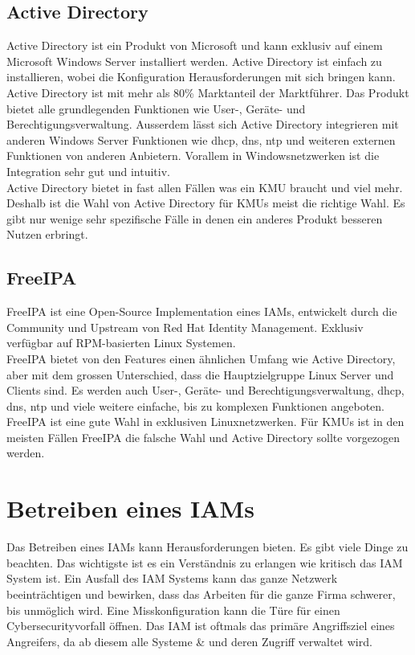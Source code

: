 \subsection{Active Directory}
Active Directory ist ein Produkt von Microsoft und kann exklusiv auf einem Microsoft Windows Server installiert werden. Active Directory ist einfach zu installieren, wobei die Konfiguration Herausforderungen mit sich bringen kann.\\

Active Directory ist mit mehr als 80\% Marktanteil der Marktführer.
Das Produkt bietet alle grundlegenden Funktionen wie User-, Geräte- und Berechtigungsverwaltung.
Ausserdem lässt sich Active Directory integrieren mit anderen Windows Server Funktionen wie \acrshort{dhcp}, \acrshort{dns}, \acrshort{ntp} und weiteren externen Funktionen von anderen Anbietern.
Vorallem in Windowsnetzwerken ist die Integration sehr gut und intuitiv.\\


Active Directory bietet in fast allen Fällen was ein KMU braucht und viel mehr. Deshalb ist die Wahl von Active Directory für KMUs meist die richtige Wahl. Es gibt nur wenige sehr spezifische Fälle in denen ein anderes Produkt besseren Nutzen erbringt.


\subsection{FreeIPA}
FreeIPA ist eine Open-Source Implementation eines IAMs, entwickelt durch die Community und Upstream von Red Hat Identity Management. Exklusiv verfügbar auf RPM-basierten Linux Systemen.\\

FreeIPA bietet von den Features einen ähnlichen Umfang wie Active Directory, aber mit dem grossen Unterschied, dass die Hauptzielgruppe Linux Server und Clients sind. Es werden auch User-, Geräte- und Berechtigungsverwaltung, \acrshort{dhcp}, \acrshort{dns}, \acrshort{ntp} und viele weitere einfache, bis zu komplexen Funktionen angeboten.\\

FreeIPA ist eine gute Wahl in exklusiven Linuxnetzwerken. Für KMUs ist in den meisten Fällen FreeIPA die falsche Wahl und Active Directory sollte vorgezogen werden.


\section{Betreiben eines IAMs}
Das Betreiben eines IAMs kann Herausforderungen bieten.
Es gibt viele Dinge zu beachten.
Das wichtigste ist es ein Verständnis zu erlangen wie kritisch das IAM System ist.
Ein Ausfall des IAM Systems kann das ganze Netzwerk beeinträchtigen und bewirken, dass das Arbeiten für die ganze Firma schwerer, bis unmöglich wird.
Eine Misskonfiguration kann die Türe für einen Cybersecurityvorfall öffnen.
Das IAM ist oftmals das primäre Angriffsziel eines Angreifers, da ab diesem alle Systeme \& und deren Zugriff verwaltet wird.\\

